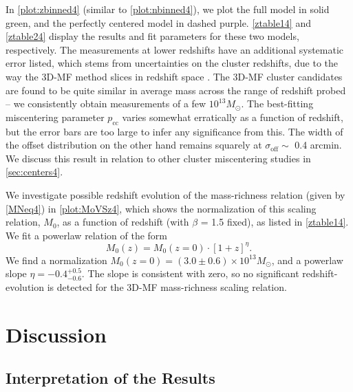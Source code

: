 In \autoref{plot:zbinned4} (similar to \autoref{plot:nbinned4}), we plot the full model in solid green, and the perfectly centered model in dashed purple. \autoref{ztable14} and \autoref{ztable24} display the results and fit parameters for these two models, respectively. The measurements at lower redshifts have an additional systematic error listed, which stems from uncertainties on the cluster redshifts, due to the way the \ac{3D-MF} method slices in redshift space \citep{Ford14}. The \ac{3D-MF} cluster candidates are found to be quite similar in average mass across the range of redshift probed -- we consistently obtain measurements of a few $10^{13} M_{\odot}$. The best-fitting miscentering parameter $p_{\mathrm{cc}}$ varies somewhat erratically as a function of redshift, but the error bars are too large to infer any significance from this. The width of the offset distribution on the other hand remains squarely at $\sigma_{\mathrm{off}} \sim$ 0.4 arcmin. We discuss this result in relation to other cluster miscentering studies in \autoref{sec:centers4}.

We investigate possible redshift evolution of the mass-richness relation (given by \autoref{MNeq4}) in \autoref{plot:MoVSz4}, which shows the normalization of this scaling relation, $M_0$, as a function of redshift (with $\beta$ = 1.5 fixed), as listed in \autoref{ztable14}. We fit a powerlaw relation of the form
\begin{equation}
\label{MoZeq4}
M_0 (z) = M_0 (z=0) \cdot \left[ 1+z \right] ^{\eta}.
\end{equation}
We find a normalization $M_0 (z=0) = (3.0 \pm 0.6) \times 10^{13} M_{\odot}$, and a powerlaw slope $\eta = -0.4^{+0.5}_{-0.6}$. The slope is consistent with zero, so no significant redshift-evolution is detected for the \ac{3D-MF} mass-richness scaling relation.



\section{Discussion}
\label{sec:disc4}


\subsection{Interpretation of the Results}

